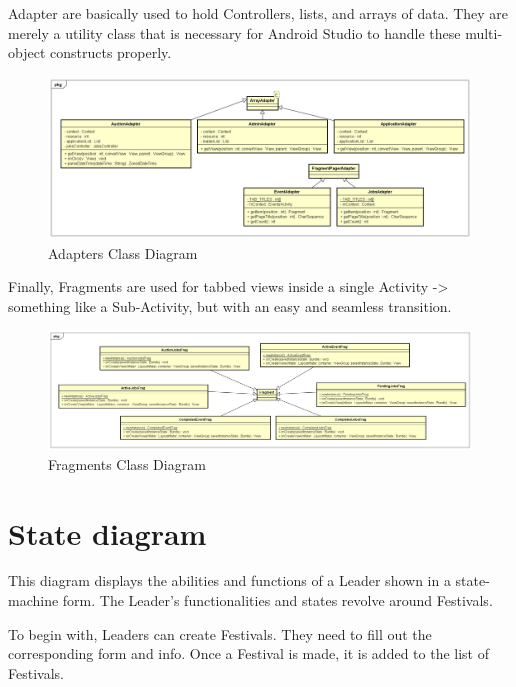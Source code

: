 		Adapter are basically used to hold Controllers, lists, and arrays of data. They are merely a utility class that is necessary for Android Studio to handle these multi-object constructs properly.
		
		\begin{figure}[H]
			\includegraphics[width=\linewidth]{diagrams/Adapters Class Diagram.png}
			\caption{Adapters Class Diagram}
			\label{fig:adapters_class_diag}
		\end{figure}
		
		Finally, Fragments are used for tabbed views inside a single Activity -> something like a Sub-Activity, but with an easy and seamless transition.
		
		\begin{figure}[H]
			\includegraphics[width=\linewidth]{diagrams/Fragments Class Diagram.png}
			\caption{Fragments Class Diagram}
			\label{fig:fragments_class_diag}
		\end{figure}
		
		\section{State diagram}
			
			This diagram displays the abilities and functions of a Leader shown in a state-machine form. The Leader's functionalities and states revolve around Festivals.
			
			To begin with, Leaders can create Festivals. They need to fill out the corresponding form and info. Once a Festival is made, it is added to the list of Festivals.
			
